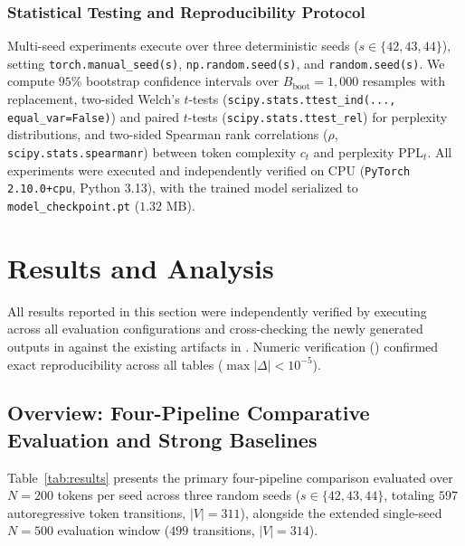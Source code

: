 \documentclass{interact}
\begin{document}
\subsubsection{Statistical Testing and Reproducibility Protocol}

Multi-seed experiments execute over three deterministic seeds ($s \in \{42, 43, 44\}$), setting \texttt{torch.manual\_seed(s)}, \texttt{np.random.seed(s)}, and \texttt{random.seed(s)}. We compute $95\%$ bootstrap confidence intervals over $B_{\text{boot}} = 1,000$ resamples with replacement, two-sided Welch's $t$-tests (\texttt{scipy.stats.ttest\_ind(..., equal\_var=False)}) and paired $t$-tests (\texttt{scipy.stats.ttest\_rel}) for perplexity distributions, and two-sided Spearman rank correlations ($\rho$, \texttt{scipy.stats.spearmanr}) between token complexity $c_t$ and perplexity $\text{PPL}_t$. All experiments were executed and independently verified on CPU (\texttt{PyTorch 2.10.0+cpu}, Python 3.13), with the trained model serialized to \texttt{model\_checkpoint.pt} ($1.32\text{ MB}$).


\section{Results and Analysis}
\label{sec:results}

All results reported in this section were independently verified by executing  across all evaluation configurations and cross-checking the newly generated outputs in  against the existing artifacts in . Numeric verification () confirmed exact reproducibility across all tables ($\max|\Delta| < 10^{-5}$).

\subsection{Overview: Four-Pipeline Comparative Evaluation and Strong Baselines}
\label{subsec:four_pipeline_results}

Table~\ref{tab:results} presents the primary four-pipeline comparison evaluated over $N = 200$ tokens per seed across three random seeds ($s \in \{42, 43, 44\}$, totaling $597$ autoregressive token transitions, $|V| = 311$), alongside the extended single-seed $N = 500$ evaluation window ($499$ transitions, $|V| = 314$).
\end{document}
